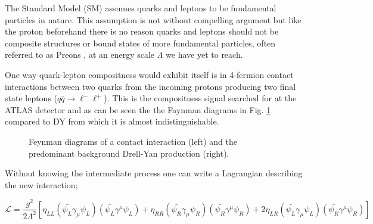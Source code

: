         The Standard Model (SM) assumes quarks and leptons to be fundamental particles in nature. This assumption is not without compelling argument but like the proton beforehand there is no reason quarks and leptons should not be composite structures or bound states of more fundamental particles, often referred to as Preons \cite{Eichten:1983hw}, at an energy scale $\Lambda$ we have yet to reach. 

        One way quark-lepton compositness would exhibit itself is in 4-fermion contact interactions between two quarks from the incoming protons producing two final state leptons ($q\bar{q} \rightarrow \ell^{-}\ell^{+}$). This is the compositness signal searched for at the ATLAS detector and as can be seen the the Faynman diagrams in Fig. \ref{fig:fd} compared to DY from which it is almost indistinguishable.

        \begin{figure}[h]
            \begin{center}
            \end{center}
            \caption{Feynman diagrams of a contact interaction (left) and the predominant background Drell-Yan production (right).}
            \label{fig:fd}
        \end{figure}

        Without knowing the intermediate process one can write a Lagrangian describing the new interaction; 

        \begin{equation}
            \mathcal{L} = \frac{g^{2}}{2\Lambda^{2}}
                [\eta_{LL} (\bar{\psi_{L}}\gamma_{\mu}\psi_{L}) (\bar{\psi_{L}}\gamma^{\mu}\psi_{L}) 
                + \eta_{RR} (\bar{\psi_{R}}\gamma_{\mu}\psi_{R}) (\bar{\psi_{R}}\gamma^{\mu}\psi_{R}) 
                + 2\eta_{LR} (\bar{\psi_{L}}\gamma_{\mu}\psi_{L}) (\bar{\psi_{R}}\gamma^{\mu}\psi_{R}) ]
        \end{equation}

